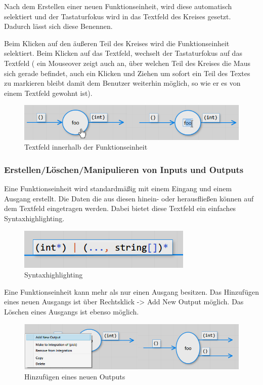 	
	Nach dem Erstellen einer neuen Funktionseinheit, wird diese automatisch
	selektiert und der Tastaturfokus wird in das Textfeld des Kreises gesetzt.
	Dadurch lässt sich diese Benennen.
	
	Beim Klicken auf den äußeren Teil des Kreises wird die Funktionseinheit
	selektiert. Beim Klicken auf das Textfeld, wechselt der Tastaturfokus auf
	das Textfeld ( ein Mouseover zeigt auch an, über welchen Teil des Kreises
	die Maus sich gerade befindet, auch ein Klicken und Ziehen um sofort ein Teil
	des Textes zu markieren bleibt damit dem Benutzer weiterhin möglich, so wie er es von
	einem Textfeld gewohnt ist).
	
			\begin{figure}[H]
				\centering
				\includegraphics[width=1\linewidth]{./img/functionUnitCursor.jpg} 
				\caption{Textfeld innerhalb der Funktionseinheit}
			\end{figure}
	
	
\subsubsection{Erstellen/Löschen/Manipulieren von Inputs und Outputs}

	Eine Funktionseinheit wird standardmäßig mit einem Eingang und einem Ausgang
	erstellt. Die Daten die aus diesen hinein- oder herausfließen können auf
	dem Textfeld eingetragen werden. Dabei bietet diese Textfeld ein einfaches
	Syntaxhighlighting.
	
		\begin{figure}[H]
			\centering
			\includegraphics[width=0.4\linewidth]{./img/synatxHighlighting.jpg} 
			\caption{Syntaxhighlighting}
		\end{figure}
	
		
	Eine Funktionseinheit kann mehr als nur einen Ausgang besitzen.
	Das Hinzufügen eines neuen Ausgangs ist über Rechtsklick -> Add New Output möglich.
	Das Löschen eines Ausgangs ist ebenso möglich.

	\begin{figure}[H]
		\centering
		\includegraphics[width=1\linewidth]{./img/addOutput.jpg} 
		\caption{Hinzufügen eines neuen Outputs}
	\end{figure}




